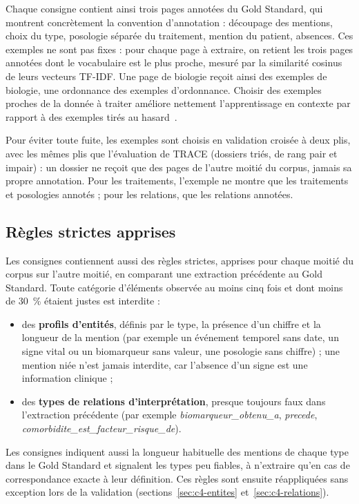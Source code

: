 Chaque consigne contient ainsi trois pages annotées du Gold Standard, qui montrent concrètement la convention d'annotation : découpage des mentions, choix du type, posologie séparée du traitement, mention du patient, absences. Ces exemples ne sont pas fixes : pour chaque page à extraire, on retient les trois pages annotées dont le vocabulaire est le plus proche, mesuré par la similarité cosinus de leurs vecteurs TF-IDF. Une page de biologie reçoit ainsi des exemples de biologie, une ordonnance des exemples d'ordonnance. Choisir des exemples proches de la donnée à traiter améliore nettement l'apprentissage en contexte par rapport à des exemples tirés au hasard~\cite{liu2022incontext}.

Pour éviter toute fuite, les exemples sont choisis en validation croisée à deux plis, avec les mêmes plis que l'évaluation de TRACE (dossiers triés, de rang pair et impair) : un dossier ne reçoit que des pages de l'autre moitié du corpus, jamais sa propre annotation. Pour les traitements, l'exemple ne montre que les traitements et posologies annotés ; pour les relations, que les relations annotées.

\subsection{Règles strictes apprises}\label{sec:c4-regles-strictes}

Les consignes contiennent aussi des règles strictes, apprises pour chaque moitié du corpus sur l'autre moitié, en comparant une extraction précédente au Gold Standard. Toute catégorie d'éléments observée au moins cinq fois et dont moins de 30~\% étaient justes est interdite :
\begin{itemize}
  \item des \textbf{profils d'entités}, définis par le type, la présence d'un chiffre et la longueur de la mention (par exemple un événement temporel sans date, un signe vital ou un biomarqueur sans valeur, une posologie sans chiffre) ; une mention niée n'est jamais interdite, car l'absence d'un signe est une information clinique ;
  \item des \textbf{types de relations d'interprétation}, presque toujours faux dans l'extraction précédente (par exemple \emph{biomarqueur\_obtenu\_a}, \emph{precede}, \emph{comorbidite\_est\_facteur\_risque\_de}).
\end{itemize}
Les consignes indiquent aussi la longueur habituelle des mentions de chaque type dans le Gold Standard et signalent les types peu fiables, à n'extraire qu'en cas de correspondance exacte à leur définition. Ces règles sont ensuite réappliquées sans exception lors de la validation (sections~\ref{sec:c4-entites} et~\ref{sec:c4-relations}).

